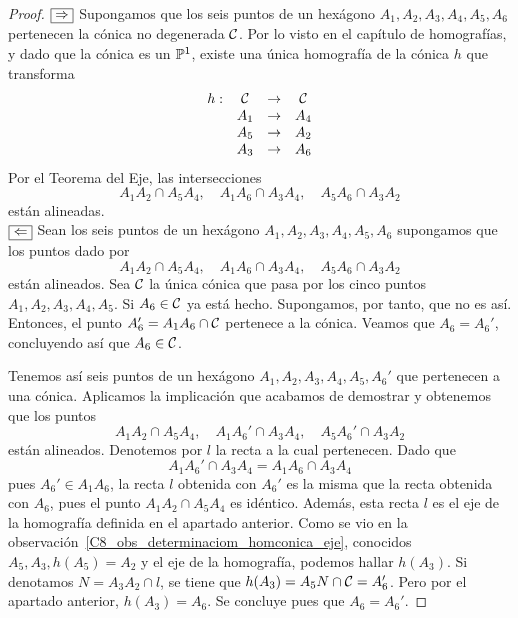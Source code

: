 \begin{proof}
	$\fbox{$\Rightarrow$}$ Supongamos que los seis puntos de un hexágono $A_1,A_2,A_3,A_4,A_5,A_6$ pertenecen la cónica no degenerada $\mathcal{C}$. Por lo visto en el capítulo de homografías, y dado que la cónica es un $\mathbb{P}^1$, existe una única homografía de la cónica $h$ que transforma
	\begin{equation*}
		\begin{array}{cccc}
			h:&\mathcal{C}&\rightarrow &\mathcal{C}\\
			& A_1&\rightarrow &A_4\\
			& A_5&\rightarrow &A_2\\
			& A_3&\rightarrow &A_6
		\end{array}
	\end{equation*}
	Por el Teorema del Eje, las intersecciones
	\begin{equation*}
		A_1A_2\cap A_5A_4, \quad A_1A_6\cap A_3A_4, \quad A_5A_6\cap A_3A_2
	\end{equation*}
	están alineadas.\\
	
	$\fbox{$\Leftarrow$}$ Sean los seis puntos de un hexágono $A_1,A_2,A_3,A_4,A_5,A_6$ supongamos que los puntos dado por
	\begin{equation*}
		A_1A_2\cap A_5A_4, \quad A_1A_6\cap A_3A_4, \quad A_5A_6\cap A_3A_2
	\end{equation*}
	están alineados. Sea $\mathcal{C}$ la única cónica que pasa por los cinco puntos $A_1,A_2,A_3,A_4,A_5$. Si $A_6\in\mathcal{C}$ ya está hecho. Supongamos, por tanto, que no es así. Entonces, el punto $A_6'=A_1A_6\cap\mathcal{C}$ pertenece a la cónica. Veamos que $A_6=A_6'$, concluyendo así que $A_6\in\mathcal{C}$.
	
	Tenemos así seis puntos de un hexágono $A_1,A_2,A_3,A_4,A_5,A_6'$ que pertenecen a una cónica. Aplicamos la implicación que acabamos de demostrar y obtenemos que los puntos
	\begin{equation*}
		A_1A_2\cap A_5A_4, \quad A_1A_6'\cap A_3A_4, \quad A_5A_6'\cap A_3A_2
	\end{equation*}
	están alineados. Denotemos por $l$ la recta a la cual pertenecen. Dado que
	\begin{equation*}
		A_1A_6'\cap A_3A_4=A_1A_6\cap A_3A_4
	\end{equation*}
	pues $A_6'\in A_1A_6$, la recta $l$ obtenida con $A_6'$ es la misma que la recta obtenida con $A_6$, pues el punto $A_1A_2\cap A_5A_4$ es idéntico. Además, esta recta $l$ es el eje de la homografía definida en el apartado anterior. Como se vio en la observación~\ref{C8_obs_determinaciom_homconica_eje}, conocidos $A_5,A_3,h(A_5)=A_2$ y el eje de la homografía, podemos hallar $h(A_3)$. Si denotamos $N=A_3A_2\cap l$, se tiene que $h(A_3)=A_5N\cap \mathcal{C}=A_6'$. Pero por el apartado anterior, $h(A_3)=A_6$. Se concluye pues que $A_6=A_6'$.
\end{proof}

